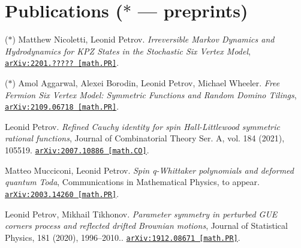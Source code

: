 \documentclass[letterpaper,11pt]{article}
\begin{document}
\section*{Publications ($*$ --- preprints)}

\begin{etaremune}
	\renewcommand{\labelenumi}{[\theenumi]}
	
	
	\item ($*$)
	Matthew Nicoletti, Leonid Petrov.
	\emph{Irreversible Markov Dynamics and Hydrodynamics for KPZ States in the Stochastic Six Vertex Model}, 
	\href{https://arxiv.org/abs/2201.?????}{\texttt{arXiv:2201.????? [math.PR]}}.
	
	
	
	
	
	
	
	
	
	\item ($*$)
	Amol Aggarwal, Alexei Borodin, Leonid Petrov, Michael Wheeler.
	\emph{Free Fermion Six Vertex Model: Symmetric Functions and Random Domino Tilings}, 
	\href{https://arxiv.org/abs/2109.06718}{\texttt{arXiv:2109.06718 [math.PR]}}.
	
	
	
	
	
	
	
	
	
	
	
	
	
	
	
	
	
	\item 
	Leonid Petrov.
	\emph{Refined Cauchy identity for spin Hall-Littlewood symmetric rational functions}, Journal of Combinatorial Theory Ser. A, vol. 184 (2021), 105519. 
	\href{https://arxiv.org/abs/2007.10886}{\texttt{arXiv:2007.10886 [math.CO]}}.
	
	
	
	
	
	
	
	\item 
	Matteo Mucciconi, Leonid Petrov.
	\emph{Spin q-Whittaker polynomials and deformed quantum Toda}, Communications in Mathematical Physics, to appear. 
	\href{https://arxiv.org/abs/2003.14260}{\texttt{arXiv:2003.14260 [math.PR]}}.
	
	
	
	
	
	
	
	
	
	\item 
	Leonid Petrov, Mikhail Tikhonov.
	\emph{Parameter symmetry in perturbed GUE corners process and reflected drifted Brownian motions}, Journal of Statistical Physics, 181 (2020), 1996–2010.. 
	\href{https://arxiv.org/abs/1912.08671}{\texttt{arXiv:1912.08671 [math.PR]}}.
	

\end{etaremune}
\end{document}
